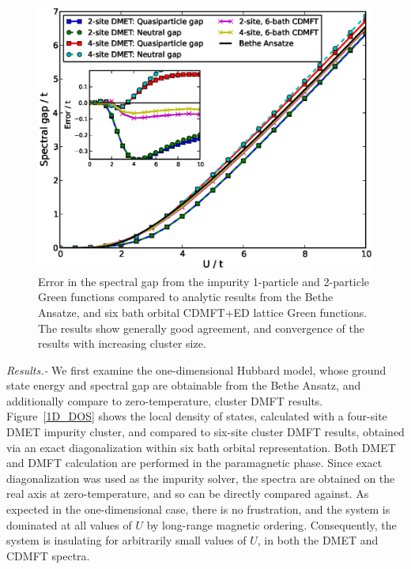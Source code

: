 \documentclass[aps,twocolumn,nobibnotes]{revtex4}
\begin{document}
\begin{figure}
\begin{center}
    \vspace{-2mm}
\includegraphics[scale=0.425]{Hubbard_Gap.eps}
\end{center}
    \vspace{-8mm}
\caption{Error in the spectral gap from the impurity 1-particle and 2-particle Green functions compared to analytic results
from the Bethe Ansatze\cite{Ovchinni1970}, and six bath orbital CDMFT+ED lattice Green functions. The results show generally 
good agreement, and convergence of the results with increasing cluster size.}
\label{1D_GAP}
\end{figure}

\emph{Results.-} We first examine the one-dimensional Hubbard model, whose ground state energy\cite{Lieb68} and spectral gap\cite{Ovchinni1970} are 
obtainable from the Bethe Ansatz, and additionally compare to
zero-temperature, cluster DMFT results\cite{Go2009}. Figure~\ref{1D_DOS} shows the local density of states, calculated with a four-site DMET 
impurity cluster, and compared to six-site cluster DMFT results, obtained via an exact diagonalization within six bath orbital representation. 
Both DMET and DMFT calculation are performed in the paramagnetic phase. 
Since exact diagonalization was used as the impurity solver, 
the spectra are obtained on the real axis at zero-temperature, and so can be directly compared against. As expected in the one-dimensional case, there is no
frustration, and the system is dominated at all values of $U$ by long-range magnetic ordering\cite{Lieb68}. Consequently, 
the system is insulating for arbitrarily small values of $U$, in both the DMET and CDMFT spectra. 
\end{document}
